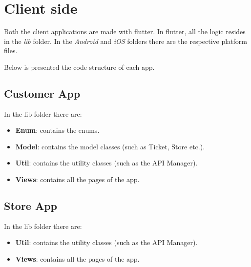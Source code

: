 \section{Client side}
Both the client applications are made with flutter. In flutter, all the logic resides in the \textit{lib} folder. In the \textit{Android} and \textit{iOS} folders there are the respective platform files.

Below is presented the code structure of each app.
\subsection{Customer App}
In the lib folder there are:
\begin{itemize}
	\item \textbf{Enum}: contains the enums.
	\item \textbf{Model}: contains the model classes (such as Ticket, Store etc.).
	\item \textbf{Util}: contains the utility classes (such as the API Manager).
	\item \textbf{Views}: contains all the pages of the app.
\end{itemize}
\subsection{Store App}
In the lib folder there are:
\begin{itemize}
	\item \textbf{Util}: contains the utility classes (such as the API Manager).
	\item \textbf{Views}: contains all the pages of the app.
\end{itemize}